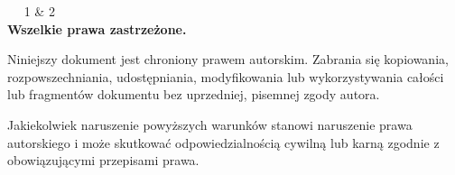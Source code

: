 \newcommand{\CopyrightAuthors}{
	1 \&
	2
}
\begin{center}
	\vspace*{0.5cm}
	\textcopyright  ~\MyCopyrightYear ~\CopyrightAuthors \\\textbf{Wszelkie prawa zastrzeżone.}
	
	\vspace{0.5cm}
	Niniejszy dokument jest chroniony prawem autorskim.  
	Zabrania się kopiowania, rozpowszechniania, udostępniania, modyfikowania lub wykorzystywania całości lub fragmentów dokumentu bez uprzedniej, pisemnej zgody autora.
	
	\vspace{0.5cm}
	Jakiekolwiek naruszenie powyższych warunków stanowi naruszenie prawa autorskiego i może skutkować odpowiedzialnością cywilną lub karną zgodnie z obowiązującymi przepisami prawa.
\end{center}
